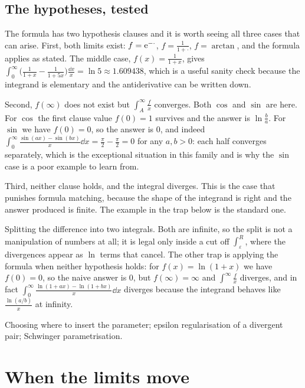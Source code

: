 \subsection{The hypotheses, tested}

The formula has two hypothesis clauses and it is worth seeing all three cases that can arise. First, both limits exist: $f=\mathrm{e}^{-\cdot}$, $f=\tfrac{1}{1+\cdot}$, $f=\arctan$, and the formula applies as stated. The middle case, $f(x)=\tfrac{1}{1+x}$, gives $\int_0^\infty\bigl(\tfrac{1}{1+x}-\tfrac{1}{1+5x}\bigr)\tfrac{\dd x}{x}=\ln5\approx1.609438$, which is a useful sanity check because the integrand is elementary and the antiderivative can be written down.

Second, $f(\infty)$ does not exist but $\int_A^\infty\frac{f}{x}$ converges. Both $\cos$ and $\sin$ are here. For $\cos$ the first clause value $f(0)=1$ survives and the answer is $\ln\frac{b}{a}$. For $\sin$ we have $f(0)=0$, so the answer is $0$, and indeed $\int_0^\infty\frac{\sin(ax)-\sin(bx)}{x}\dd x=\tfrac{\pi}{2}-\tfrac{\pi}{2}=0$ for any $a,b>0$: each half converges separately, which is the exceptional situation in this family and is why the $\sin$ case is a poor example to learn from.

Third, neither clause holds, and the integral diverges. This is the case that punishes formula matching, because the shape of the integrand is right and the answer produced is finite. The example in the trap below is the standard one.

\begin{trap}
Splitting the difference into two integrals. Both are infinite, so the split is not a manipulation of numbers at all; it is legal only inside a cut off $\int_\varepsilon^{R}$, where the divergences appear as $\ln$ terms that cancel. The other trap is applying the formula when neither hypothesis holds: for $f(x)=\ln(1+x)$ we have $f(0)=0$, so the naive answer is $0$, but $f(\infty)=\infty$ and $\int^\infty\frac{f}{x}$ diverges, and in fact $\int_0^\infty\frac{\ln(1+ax)-\ln(1+bx)}{x}\dd x$ diverges because the integrand behaves like $\frac{\ln(a/b)}{x}$ at infinity.
\end{trap}

\begin{seealsob}Choosing where to insert the parameter; epsilon regularisation of a divergent pair; Schwinger parametrisation.\end{seealsob}

\section{When the limits move}

